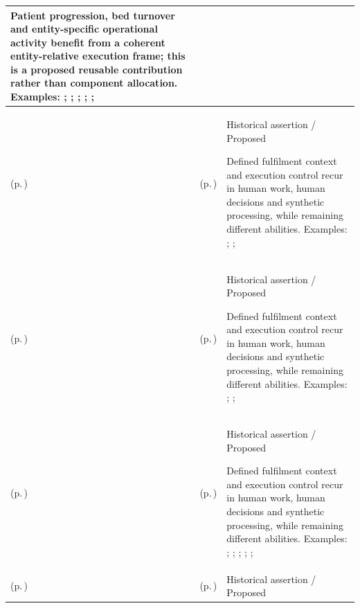 \begin{longtable}{|>{\raggedright\arraybackslash}p{0.27\TableWidth}|>{\raggedright\arraybackslash}p{0.27\TableWidth}|>{\raggedright\arraybackslash}p{0.46\TableWidth}|}
Patient progression, bed turnover and entity-specific operational activity benefit from a coherent entity-relative execution frame; this is a proposed reusable contribution rather than component allocation. Examples: \nameref{feature:feat-hso-11}; \nameref{feature:feat-hso-12}; \nameref{feature:feat-hso-13}; \nameref{function:maintain-operational-bed-state}; \nameref{service:bed-availability-query}; \nameref{function:manage-bed-turnover-progression}\\\hline
\nameref{cap:bec-governed-operational-activity-design} (p.\,\pageref{cap:bec-governed-operational-activity-design}) & \nameref{cap:ec-operational-fulfilment-definition} (p.\,\pageref{cap:ec-operational-fulfilment-definition}) & Historical assertion / Proposed

Defined fulfilment context and execution control recur in human work, human decisions and synthetic processing, while remaining different abilities. Examples: \nameref{feature:operational-activity-context-definition}; \nameref{feature:activity-outcome-continuation-rules}; \nameref{function:maintain-operational-fulfilment-definition}\\\hline
\nameref{cap:bec-governed-operational-activity-design} (p.\,\pageref{cap:bec-governed-operational-activity-design}) & \nameref{cap:ec-governed-activity-execution-control} (p.\,\pageref{cap:ec-governed-activity-execution-control}) & Historical assertion / Proposed

Defined fulfilment context and execution control recur in human work, human decisions and synthetic processing, while remaining different abilities. Examples: \nameref{feature:operational-activity-context-definition}; \nameref{feature:activity-outcome-continuation-rules}; \nameref{function:maintain-operational-fulfilment-definition}\\\hline
\nameref{cap:bec-workflow-activity-coordination} (p.\,\pageref{cap:bec-workflow-activity-coordination}) & \nameref{cap:ec-operational-fulfilment-definition} (p.\,\pageref{cap:ec-operational-fulfilment-definition}) & Historical assertion / Proposed

Defined fulfilment context and execution control recur in human work, human decisions and synthetic processing, while remaining different abilities. Examples: \nameref{feature:feat-ise-20}; \nameref{feature:feat-ise-21}; \nameref{feature:feat-ise-22}; \nameref{feature:feat-ise-23}; \nameref{function:coordinate-work-order}; \nameref{service:work-order-coordination-service}\\\hline
\nameref{cap:bec-workflow-activity-coordination} (p.\,\pageref{cap:bec-workflow-activity-coordination}) & \nameref{cap:ec-governed-activity-execution-control} (p.\,\pageref{cap:ec-governed-activity-execution-control}) & Historical assertion / Proposed


\end{longtable}
